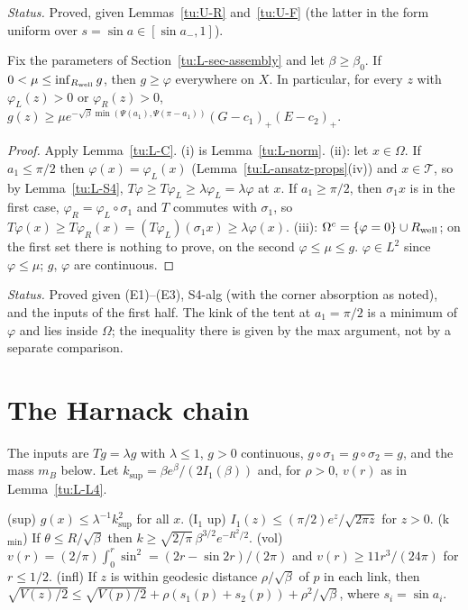 \noindent\emph{Status.} Proved, given Lemmas~\ref{tu:U-R} and~\ref{tu:U-F} (the latter in the form uniform over
$s=\sin a\in[\sin a_-,1]$).

\begin{proposition}\label{tu:L-sub}
Fix the parameters of Section~\ref{tu:L-sec-assembly} and let $\beta\ge\beta_0$. If $0<\mu\le\inf_{R_{\rm well}}g$,
then $g\ge\varphi$ everywhere on $X$. In particular, for every $z$ with $\varphi_L(z)>0$ or $\varphi_R(z)>0$,
$g(z)\ge\mu e^{-\sqrt\beta\min(\Psi(a_1),\Psi(\pi-a_1))}(G-c_1)_+(E-c_2)_+$.
\end{proposition}

\begin{proof}
Apply Lemma~\ref{tu:L-C}. (i) is Lemma~\ref{tu:L-norm}. (ii): let $x\in\Omega$. If $a_1\le\pi/2$ then
$\varphi(x)=\varphi_L(x)$ (Lemma~\ref{tu:L-ansatz-props}(iv)) and $x\in\mathcal T$, so by Lemma~\ref{tu:L-S4},
$T\varphi\ge T\varphi_L\ge\lambda\varphi_L=\lambda\varphi$ at $x$. If $a_1\ge\pi/2$, then $\sigma_1x$ is in the first case,
$\varphi_R=\varphi_L\circ\sigma_1$ and $T$ commutes with $\sigma_1$, so $T\varphi(x)\ge T\varphi_R(x)=(T\varphi_L)(\sigma_1x)\ge\lambda\varphi(x)$.
(iii): $\Omega^c=\{\varphi=0\}\cup R_{\rm well}$; on the first set there is nothing to prove, on the second
$\varphi\le\mu\le g$. $\varphi\in L^2$ since $\varphi\le\mu$; $g$, $\varphi$ are continuous.
\end{proof}

\noindent\emph{Status.} Proved given (E1)--(E3), S4-alg (with the corner absorption as noted), and the inputs of the first half.
The kink of the tent at $a_1=\pi/2$ is a minimum of $\varphi$ and lies inside $\Omega$; the inequality there is
given by the max argument, not by a separate comparison.

\section{The Harnack chain}\label{tu:L-sec-harnack}

The inputs are $Tg=\lambda g$ with $\lambda\le1$, $g>0$ continuous, $g\circ\sigma_1=g\circ\sigma_2=g$, and the mass
$m_B$ below. Let $k_{\sup}=\beta e^\beta/(2I_1(\beta))$ and, for $\rho>0$, $v(r)$ as in Lemma~\ref{tu:L-L4}.

\begin{lemma}\label{tu:L-elem}
(sup) $g(x)\le\lambda^{-1}k_{\sup}^2$ for all $x$.
(I$_1$ up) $I_1(z)\le(\pi/2)e^z/\sqrt{2\pi z}$ for $z>0$.
(k$_{\min}$) If $\theta\le R/\sqrt\beta$ then $k\ge\sqrt{2/\pi}\,\beta^{3/2}e^{-R^2/2}$.
(vol) $v(r)=(2/\pi)\int_0^r\sin^2=(2r-\sin2r)/(2\pi)$ and $v(r)\ge11r^3/(24\pi)$ for $r\le1/2$.
(infl) If $z$ is within geodesic distance $\rho/\sqrt\beta$ of $p$ in each link, then
$\sqrt{V(z)/2}\le\sqrt{V(p)/2}+\rho(s_1(p)+s_2(p))+\rho^2/\sqrt\beta$, where $s_i=\sin a_i$.
\end{lemma}

